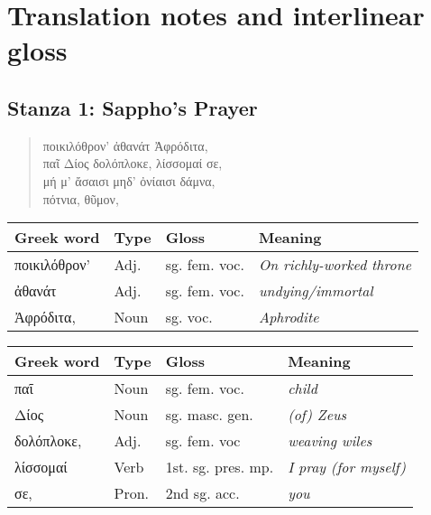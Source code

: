 \section*{Translation notes and interlinear gloss}
\subsection*{Stanza 1: Sappho's Prayer}
\begin{quote}
  ποικιλόθρον’ ἀθανάτ Ἀφρόδιτα,\\
  παῖ Δίος δολόπλοκε, λίσσομαί σε,\\
  μή μ’ ἄσαισι μηδ’ ὀνίαισι δάμνα,\\
  πότνια, θῦμον,\\
\end{quote}

\begin{table}[H]
\begin{tabular}{@{}llll@{}}
\toprule
\textbf{Greek word} & \textbf{Type} & \textbf{Gloss}      & \textbf{Meaning}                 \\ \midrule
ποικιλόθρον'        & Adj.          & sg. fem. voc. & \textit{On richly-worked throne} \\
ἀθανάτ              & Adj.          & sg. fem. voc. & \textit{undying/immortal}        \\
Ἀφρόδιτα,           & Noun          & sg. voc.            & \textit{Aphrodite}               \\ \bottomrule
\end{tabular}
\end{table}

\begin{table}[H]
\begin{tabular}{@{}llll@{}}
\toprule
\textbf{Greek word} & \textbf{Type} & \textbf{Gloss}     & \textbf{Meaning}             \\ \midrule
παῖ                 & Noun          & sg. fem. voc.      & \textit{child}               \\
Δίος                & Noun          & sg. masc. gen.     & \textit{(of) Zeus}           \\
δολόπλοκε,          & Adj.          & sg. fem. voc       & \textit{weaving wiles}       \\
λίσσομαί            & Verb          & 1st. sg. pres. mp. & \textit{I pray (for myself)} \\
σε,                 & Pron.         & 2nd sg. acc.       & \textit{you}                 \\ \bottomrule
\end{tabular}
\end{table}


